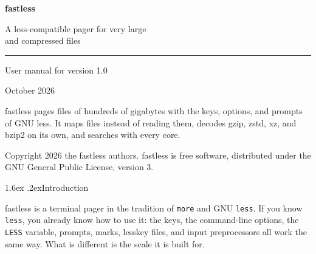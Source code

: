\documentclass[11pt,a4paper]{article}
\makeatletter
\renewcommand\section{\@startsection{section}{1}{\z@}{-3.2ex \@plus -1ex \@minus -.2ex}%
  {1.6ex \@plus .2ex}{\sffamily\Large\bfseries\color{accent}}}
\newcommand{\cmd}[1]{\texttt{#1}}
\newcommand{\env}[1]{\texttt{#1}}
\newcommand{\fl}{\textsf{\small\color{accent}fastless}}
\makeatother
\begin{document}
\begin{titlepage}
\vspace*{40mm}
{\sffamily\fontsize{46}{50}\selectfont\bfseries\color{accent}fastless\par}
\vspace{6mm}
{\sffamily\LARGE A less-compatible pager for very large\\[1mm] and compressed files\par}
\vspace{10mm}
{\color{accent}\rule{\linewidth}{1.2pt}}
\vspace{6mm}

{\large User manual for version 1.0\par}
\vspace{2mm}
{\color{muted}October 2026\par}

\vfill
\begin{minipage}{0.78\linewidth}\small\color{muted}
\fl{} pages files of hundreds of gigabytes with the keys, options, and prompts of
GNU less. It maps files instead of reading them, decodes gzip, zstd, xz, and bzip2
on its own, and searches with every core.

\medskip
Copyright \textcopyright{} 2026 the fastless authors. fastless is free software,
distributed under the GNU General Public License, version 3.
\end{minipage}
\end{titlepage}

\tableofcontents
\clearpage
{}

\section{Introduction}

\fl{} is a terminal pager in the tradition of \cmd{more} and GNU \cmd{less}. If
you know \cmd{less}, you already know how to use it: the keys, the command-line
options, the \env{LESS} variable, prompts, marks, lesskey files, and input
preprocessors all work the same way. What is different is the scale it is built
for.
\end{document}
